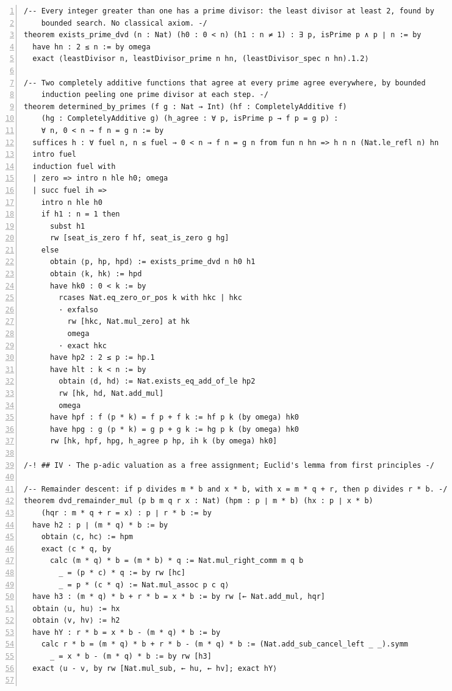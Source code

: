 \documentclass[10pt]{article}
\newcommand{\leansize}{\fontsize{5.5pt}{6.75pt}\selectfont}
\begin{document}
\begin{multicols}{2}
\begin{Verbatim}[numbers=left,firstnumber=1,numbersep=3pt,xleftmargin=2.6em,breaklines=true,breakanywhere=true,breakautoindent=false,breakindent=1.4em,breaksymbolleft={},breakanywheresymbolpre={},fontsize=\leansize]
/-- Every integer greater than one has a prime divisor: the least divisor at least 2, found by
    bounded search. No classical axiom. -/
theorem exists_prime_dvd (n : Nat) (h0 : 0 < n) (h1 : n ≠ 1) : ∃ p, isPrime p ∧ p ∣ n := by
  have hn : 2 ≤ n := by omega
  exact ⟨leastDivisor n, leastDivisor_prime n hn, (leastDivisor_spec n hn).1.2⟩

/-- Two completely additive functions that agree at every prime agree everywhere, by bounded
    induction peeling one prime divisor at each step. -/
theorem determined_by_primes (f g : Nat → Int) (hf : CompletelyAdditive f)
    (hg : CompletelyAdditive g) (h_agree : ∀ p, isPrime p → f p = g p) :
    ∀ n, 0 < n → f n = g n := by
  suffices h : ∀ fuel n, n ≤ fuel → 0 < n → f n = g n from fun n hn => h n n (Nat.le_refl n) hn
  intro fuel
  induction fuel with
  | zero => intro n hle h0; omega
  | succ fuel ih =>
    intro n hle h0
    if h1 : n = 1 then
      subst h1
      rw [seat_is_zero f hf, seat_is_zero g hg]
    else
      obtain ⟨p, hp, hpd⟩ := exists_prime_dvd n h0 h1
      obtain ⟨k, hk⟩ := hpd
      have hk0 : 0 < k := by
        rcases Nat.eq_zero_or_pos k with hkc | hkc
        · exfalso
          rw [hkc, Nat.mul_zero] at hk
          omega
        · exact hkc
      have hp2 : 2 ≤ p := hp.1
      have hlt : k < n := by
        obtain ⟨d, hd⟩ := Nat.exists_eq_add_of_le hp2
        rw [hk, hd, Nat.add_mul]
        omega
      have hpf : f (p * k) = f p + f k := hf p k (by omega) hk0
      have hpg : g (p * k) = g p + g k := hg p k (by omega) hk0
      rw [hk, hpf, hpg, h_agree p hp, ih k (by omega) hk0]

/-! ## IV · The p-adic valuation as a free assignment; Euclid's lemma from first principles -/

/-- Remainder descent: if p divides m * b and x * b, with x = m * q + r, then p divides r * b. -/
theorem dvd_remainder_mul (p b m q r x : Nat) (hpm : p ∣ m * b) (hx : p ∣ x * b)
    (hqr : m * q + r = x) : p ∣ r * b := by
  have h2 : p ∣ (m * q) * b := by
    obtain ⟨c, hc⟩ := hpm
    exact ⟨c * q, by
      calc (m * q) * b = (m * b) * q := Nat.mul_right_comm m q b
        _ = (p * c) * q := by rw [hc]
        _ = p * (c * q) := Nat.mul_assoc p c q⟩
  have h3 : (m * q) * b + r * b = x * b := by rw [← Nat.add_mul, hqr]
  obtain ⟨u, hu⟩ := hx
  obtain ⟨v, hv⟩ := h2
  have hY : r * b = x * b - (m * q) * b := by
    calc r * b = (m * q) * b + r * b - (m * q) * b := (Nat.add_sub_cancel_left _ _).symm
      _ = x * b - (m * q) * b := by rw [h3]
  exact ⟨u - v, by rw [Nat.mul_sub, ← hu, ← hv]; exact hY⟩


\end{Verbatim}
\end{multicols}
\end{document}
